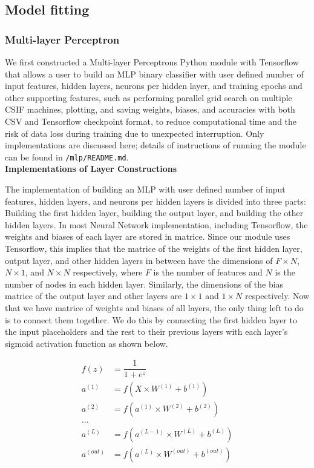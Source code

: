 \documentclass[12pt]{article}
\begin{document}
\subsection{Model fitting}

\subsubsection{Multi-layer Perceptron}

\quad We first constructed a Multi-layer Perceptrons Python module with Tensorflow that allows a user to build an MLP binary classifier with user defined number of input features, hidden layers, neurons per hidden layer, and training epochs and other supporting features, such as performing parallel grid search on multiple CSIF machines,  plotting,  and saving weights, biases, and accuracies with both CSV and Tensorflow checkpoint format, to reduce computational time and the risk of data loss during training due to unexpected interruption. Only implementations are discussed here; details of instructions of running the module can be found in \texttt{/mlp/README.md}. \\

\textbf{Implementations of Layer Constructions}

\quad The implementation of building an MLP with user defined number of input features, hidden layers, and neurons per hidden layers is divided into three parts: Building the first hidden layer, building the output layer, and building the other hidden layers. In most Neural Network implementation, including Tensorflow, the weights and biases of each layer are stored in matrice. Since our module uses Tensorflow, this implies that the matrice of the weights of the first hidden layer, output layer, and other hidden layers in between have the dimensions of $F \times N$, $N \times 1$, and $N \times N$ respectively, where $F$ is the number of features and $N$ is the number of nodes in each hidden layer. Similarly, the dimensions of the bias matrice of the output layer and other layers are $1 \times 1$ and $1 \times N$ respectively.  Now that we have matrice of weights and biases of all layers, the only thing left to do is to connect them together. We do this by connecting the first hidden layer to the input placeholders and the rest to their previous layers with each layer's sigmoid activation function as shown below.  

\begin{align}
f(z) &= \dfrac{1}{1+e^z}  \\
a^{(1)} &= f(X \times W^{(1)} + b^{(1)}) \\
a^{(2)} &= f(a^{(1)} \times W^{(2)} + b^{(2)})\\
... \\
a^{(L)} &= f(a^{(L-1)} \times W^{(L)} + b^{(L)})\\
a^{(out)} &= f(a^{(L)} \times W^{(out)} + b^{(out)})
\end{align}
\end{document}
